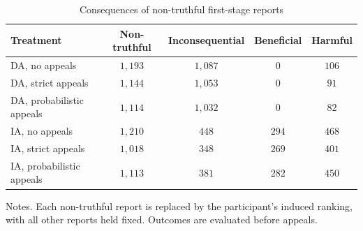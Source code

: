 \begin{table}[htbp]
\centering
\caption{Consequences of non-truthful first-stage reports}
\label{tab:consequential_rep}
\begin{tabular}{lcccc}
\toprule
Treatment & Non-truthful & Inconsequential & Beneficial & Harmful \\
\midrule
DA, no appeals & \(1{,}193\) & \(1{,}087\) & \(0\) & \(106\) \\
DA, strict appeals & \(1{,}144\) & \(1{,}053\) & \(0\) & \(91\) \\
DA, probabilistic appeals & \(1{,}114\) & \(1{,}032\) & \(0\) & \(82\) \\
IA, no appeals & \(1{,}210\) & \(448\) & \(294\) & \(468\) \\
IA, strict appeals & \(1{,}018\) & \(348\) & \(269\) & \(401\) \\
IA, probabilistic appeals & \(1{,}113\) & \(381\) & \(282\) & \(450\) \\
\bottomrule
\end{tabular}
\begin{flushleft}\footnotesize Notes. Each non-truthful report is replaced by the participant's induced ranking, with all other reports held fixed. Outcomes are evaluated before appeals.\end{flushleft}
\end{table}
